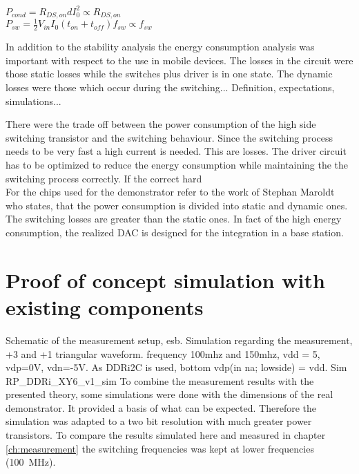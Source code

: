$ P_{cond} = R_{DS,on}dI_0^2 \propto R_{DS,on} $ \\
$ P_{sw} = \frac{1}{2} V_{in}I_0(t_{on}+t_{off})f_{sw} \propto f_{sw} $ 

In addition to the stability analysis the energy consumption analysis was important with respect to the use in mobile devices.
The losses in the circuit were those static losses while the switches plus driver is in one state.
The dynamic losses were those which occur during the switching...
Definition, expectations, simulations...

There were the trade off between the power consumption of the high side switching transistor and the switching behaviour.
Since the switching process needs to be very fast a high current is needed.
This are losses.
The driver circuit has to be optimized to reduce the energy consumption while maintaining the the switching process correctly.
If the correct hard 
\\
 For the chips used for the demonstrator refer to the work of Stephan Maroldt who states, that the power consumption is divided into static and dynamic ones. The switching losses are greater than the static ones.
In fact of the high energy consumption, the realized DAC is designed for the integration in a base station.

\section{Proof of concept simulation with existing components}
\label{ch:ProofOfConceptWithExistingComponents}
Schematic of the measurement setup, esb.
Simulation regarding the measurement, +3 and +1 triangular waveform.
frequency 100mhz and 150mhz, vdd = 5, vdp=0V, vdn=-5V.
As DDRi2C is used, bottom vdp(in na; lowside) = vdd. 
Sim RP\_DDRi\_XY6\_v1\_sim
To combine the measurement results with the presented theory, some simulations were done with the dimensions of the real demonstrator.
It provided a basis of what can be expected.
Therefore the simulation was adapted to a two bit resolution with much greater power transistors.
To compare the results simulated here and measured in chapter \ref{ch:measurement} the switching frequencies was kept at lower frequencies (\SI{100}{\mega \hertz}).

